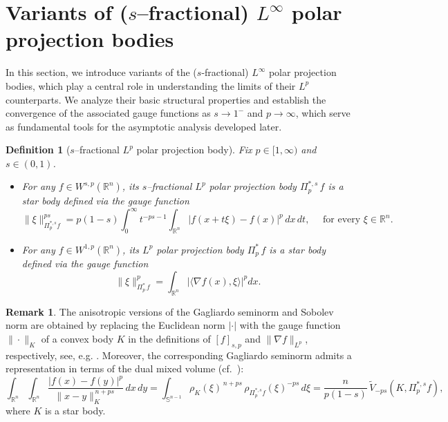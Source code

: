 \documentclass[11pt, reqno]{article}
\newtheorem{definition}[theorem]{Definition}
\theoremstyle{definition}
\numberwithin{equation}{section}
\newtheorem{remark}[theorem]{Remark}
\newcommand{\R}{\mathbb{R}}
\newcommand{\Sphere}{\mathbb{S}^{n - 1}}
\begin{document}
\section{Variants of (\(s\)--fractional) \(L^\infty\) polar projection bodies}\label{sec:linfty-bodies}

In this section, we introduce variants of the ($s$-fractional) $L^\infty$ polar projection bodies, which play a central role in understanding the limits of their $L^p$ counterparts.
We analyze their basic structural properties and establish the convergence of the associated gauge functions as $s \to 1^-$ and $p \to \infty$, which serve as fundamental tools for the asymptotic analysis developed later.

\begin{definition}[$s$--fractional $L^p$ polar projection body]\label{def.fracLp} Fix $p \in [1, \infty)$ and $s \in (0, 1)$.
	\begin{itemize}
		\item[$\bullet$] For any $f \in W^{s, p}(\R^n)$, its $s$--fractional $L^p$ polar projection body $\Pi^{\ast, s}_p \, f$ is a star body defined via the gauge function
		\begin{equation}\label{frac.Lp}
		\| \xi \|^{ps}_{\Pi^{\ast, s}_p f} = p(1 - s)\int_0^\infty t^{-ps - 1} \int_{\R^n} |f(x + t\xi) - f(x)|^p \, dx \, dt, \quad \text{ for every } \xi \in \R^n.
	\end{equation}
	
		\item[$\bullet$] For any $f \in W^{1, p} (\R^n)$, its $L^p$ polar projection body $\Pi^{\ast}_p \, f$ is a star body defined via the gauge function 
		\begin{equation}
		\| \xi \|_{\Pi^*_p \, f}^p = \int_{\R^n} | \langle \nabla f(x), \xi \rangle |^p dx.
	\end{equation}
	\end{itemize}
\end{definition}


\begin{remark}\normalfont
The anisotropic versions of the Gagliardo seminorm and Sobolev norm are obtained by replacing the Euclidean norm \( |\cdot| \) with the gauge function \(\|\cdot\|_{K}\) 
of a convex body \(K\) in the definitions of \([f ]_{s,p}\) and \(\|\nabla f \|_{L^{p}}\), respectively, see, e.g. \cite{L_2014}. 
Moreover, the corresponding Gagliardo seminorm admits a representation in terms 
of the dual mixed volume (cf.~\cite[Page~1098]{HL_2024}):
\begin{equation*}
	\int_{\R^n} \int_{\R^n} 
	\frac{|f(x) - f(y)|^p}{\| x - y \|_K^{\,n + ps}} \, dx \, dy
	= \int_{\Sphere} \rho_K(\xi)^{\,n + ps} \, 
	\rho_{\Pi^{\ast, s}_p f}(\xi)^{-ps} \, d\xi
	= \dfrac{n}{p(1 - s)}\, \widetilde{V}_{-ps}(K, \Pi^{\ast, s}_p f),
\end{equation*}
where \(K\) is a star body.

\end{remark}
\end{document}
